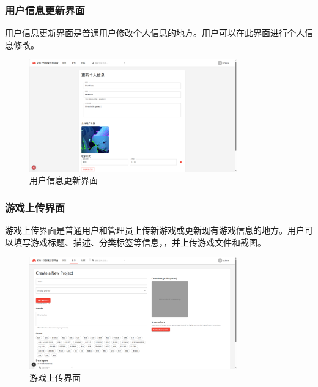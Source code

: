 \documentclass[12pt]{ctexart} %
\begin{document}
\subsubsection{用户信息更新界面}
 用户信息更新界面是普通用户修改个人信息的地方。用户可以在此界面进行个人信息修改。
\begin{figure}[H]
  \centering 
  \includegraphics[width=0.8\textwidth]{userdataupdate.png}
  \caption{用户信息更新界面}
\end{figure}
\subsubsection{游戏上传界面}
游戏上传界面是普通用户和管理员上传新游戏或更新现有游戏信息的地方。用户可以填写游戏标题、描述、分类标签等信息，，并上传游戏文件和截图。
\begin{figure}[H]
   \centering
    \includegraphics[width=0.8\textwidth]{updategame.png}
    \caption{游戏上传界面}
\end{figure}
\end{document}
